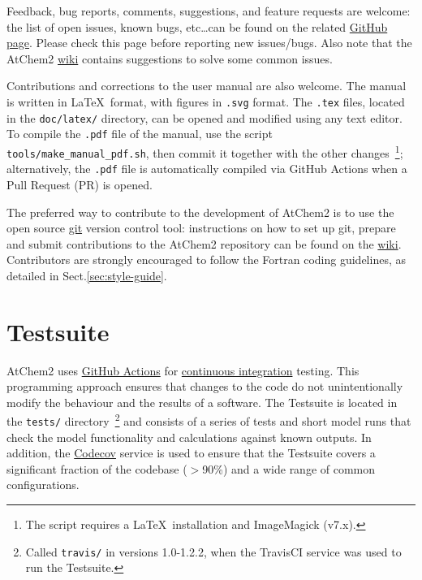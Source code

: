 Feedback, bug reports, comments, suggestions, and feature requests are
welcome: the list of open issues, known bugs, etc\ldots can be found on
the related \href{https://github.com/AtChem/AtChem2/issues}{GitHub page}.
Please check this page before reporting new issues/bugs. Also note
that the AtChem2 \href{https://github.com/AtChem/AtChem2/wiki}{wiki}
contains suggestions to solve some common issues.

Contributions and corrections to the user manual are also welcome. The
manual is written in \LaTeX\ format, with figures in \texttt{.svg}
format. The \texttt{.tex} files, located in the \texttt{doc/latex/}
directory, can be opened and modified using any text editor. To
compile the \texttt{.pdf} file of the manual, use the script
\texttt{tools/make\_manual\_pdf.sh}, then commit it together with the
other changes~\footnote{The script requires a \LaTeX\ installation and
  ImageMagick (v7.x).}; alternatively, the \texttt{.pdf} file is
automatically compiled via GitHub Actions when a Pull Request (PR) is
opened.

The preferred way to contribute to the development of AtChem2 is to
use the open source \href{https://git-scm.com}{git} version control
tool: instructions on how to set up git, prepare and submit
contributions to the AtChem2 repository can be found on the
\href{https://github.com/AtChem/AtChem2/wiki/How-to-contribute}{wiki}.
Contributors are strongly encouraged to follow the Fortran coding
guidelines, as detailed in Sect.\ref{sec:style-guide}.

\section{Testsuite} \label{sec:test-suite}

AtChem2 uses \href{https://github.com/features/actions}{GitHub Actions}
for \underline{continuous integration} testing. This programming
approach ensures that changes to the code do not unintentionally
modify the behaviour and the results of a software. The Testsuite is
located in the \texttt{tests/} directory~\footnote{Called
  \texttt{travis/} in versions 1.0-1.2.2, when the TravisCI service
  was used to run the Testsuite.}  and consists of a series of tests
and short model runs that check the model functionality and
calculations against known outputs. In addition, the
\href{https://codecov.io}{Codecov} service is used to ensure that the
Testsuite covers a significant fraction of the codebase ($>$90\%) and
a wide range of common configurations.

